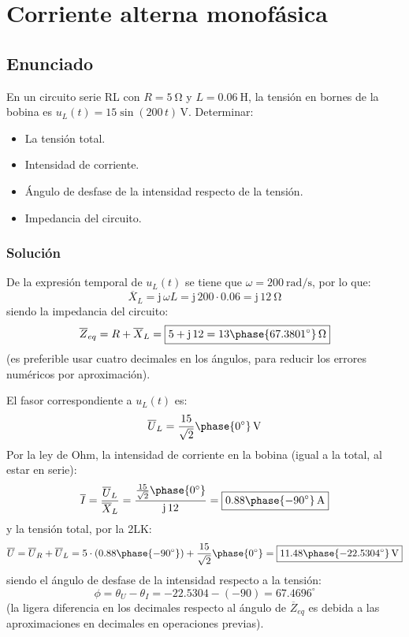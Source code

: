 \chapter{Corriente alterna monofásica}

\section{Enunciado}
En un circuito serie RL con $R=\qty{5}{\ohm}$ y $L=\qty{0.06}{\henry}$, la tensión en bornes de la bobina es $u_L(t)=15\sin(200\,t)\,\si{\volt}$. Determinar:
\begin{itemize}
\item La tensión total.
\item Intensidad de corriente.
\item Ángulo de desfase de la intensidad respecto de la tensión.
\item Impedancia del circuito.
\end{itemize}

\subsection*{Solución}

De la expresión temporal de $u_L(t)$ se tiene que $\omega=\qty{200}{\radian\per\second}$, por lo que:
\begin{equation*}
  \overline{X}_L=\mathrm{j}\,\omega L=\mathrm{j}\,200\cdot0.06=\mathrm{j}\,\qty{12}{\ohm}
\end{equation*}
siendo la impedancia del circuito:
\begin{equation*}
  \overline{Z}_{eq}=R+\overline{X}_L= \boxed{5+\mathrm{j}\,12 = 13\phase{67.3801^\circ}\,\si{\ohm}}
\end{equation*}
(es preferible usar cuatro decimales en los ángulos, para reducir los errores numéricos por aproximación).
\vspace{2mm}

\noindent El fasor correspondiente a $u_L(t)$ es:
\begin{equation*}
  \overline{U}_L=\dfrac{15}{\sqrt{2}}\phase{0^\circ}\,\si{\volt}
\end{equation*}
Por la ley de Ohm, la intensidad de corriente en la bobina (igual a la
total, al estar en serie):
\begin{equation*}
  \overline{I}=\dfrac{\overline{U}_L}{\overline{X}_L}=\dfrac{\frac{15}{\sqrt{2}}\phase{0^\circ}}{\mathrm{j}\,12}= \boxed{0.88\phase{-90^\circ}\,\si{\ampere}}
\end{equation*}
y la tensión total, por la 2LK:
\begin{equation*}
  \overline{U}=\overline{U}_R+\overline{U}_L=5\cdot (0.88\phase{-90^\circ})+\dfrac{15}{\sqrt{2}}\phase{0^\circ}= \boxed{11.48\phase{-22.5304^\circ}\,\si{\volt}}
\end{equation*}
siendo el ángulo de desfase de la intensidad respecto a la tensión:
\begin{equation*}
  \phi=\theta_U-\theta_I=-22.5304-(-90)= \boxed{67.4696^\circ}
\end{equation*}
(la ligera diferencia en los decimales respecto al ángulo de $\overline{Z}_{eq}$ es debida a las aproximaciones en decimales en operaciones previas).

